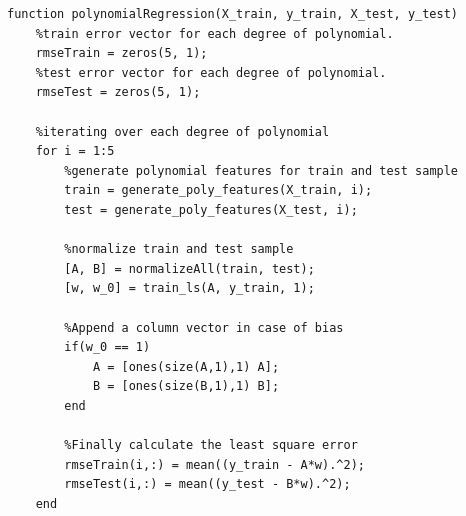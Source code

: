 \documentclass{article}
\begin{document}
\begin{itemize}
\begin{verbatim}
function polynomialRegression(X_train, y_train, X_test, y_test)
    %train error vector for each degree of polynomial.
    rmseTrain = zeros(5, 1);
    %test error vector for each degree of polynomial.
    rmseTest = zeros(5, 1);
    
    %iterating over each degree of polynomial
    for i = 1:5
        %generate polynomial features for train and test sample
        train = generate_poly_features(X_train, i);
        test = generate_poly_features(X_test, i);
        
        %normalize train and test sample
        [A, B] = normalizeAll(train, test);
        [w, w_0] = train_ls(A, y_train, 1);
        
        %Append a column vector in case of bias
        if(w_0 == 1)
            A = [ones(size(A,1),1) A];
            B = [ones(size(B,1),1) B];
        end    
        
        %Finally calculate the least square error
        rmseTrain(i,:) = mean((y_train - A*w).^2);
        rmseTest(i,:) = mean((y_test - B*w).^2);
    end


\end{verbatim}
\end{itemize}
\end{document}
